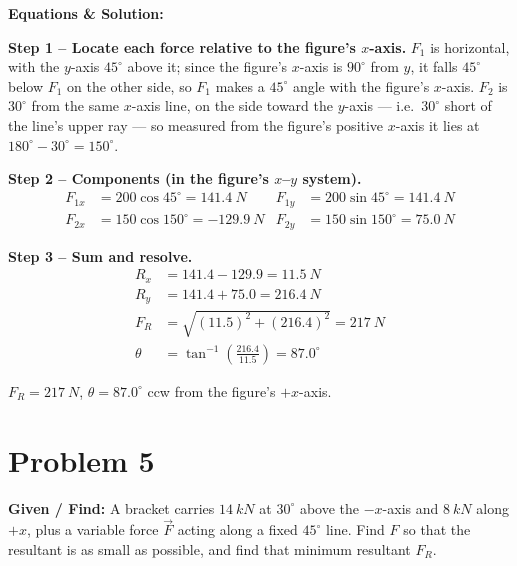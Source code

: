 \documentclass[11pt]{article}
\newcommand{\eqlabel}[1]{\textbf{#1}}
\begin{document}
\textbf{Equations \& Solution:}

\eqlabel{Step 1 -- Locate each force relative to the figure's $x$-axis.}
$F_1$ is horizontal, with the $y$-axis $45^\circ$ above it; since the figure's $x$-axis is $90^\circ$ from $y$, it falls $45^\circ$ below $F_1$ on the other side, so $F_1$ makes a $45^\circ$ angle with the figure's $x$-axis. $F_2$ is $30^\circ$ from the same $x$-axis line, on the side toward the $y$-axis --- i.e.\ $30^\circ$ short of the line's upper ray --- so measured from the figure's positive $x$-axis it lies at $180^\circ - 30^\circ = 150^\circ$.

\eqlabel{Step 2 -- Components (in the figure's $x$--$y$ system).}
\begin{align*}
    F_{1x} &= 200\cos 45^\circ = \SI{141.4}{N} & F_{1y} &= 200 \sin 45^\circ = \SI{141.4}{N} \\
    F_{2x} &= 150 \cos 150^\circ = \SI{-129.9}{N} & F_{2y} &= 150 \sin 150^\circ = \SI{75.0}{N}
\end{align*}

\eqlabel{Step 3 -- Sum and resolve.}
\begin{align*}
    R_x &= 141.4 - 129.9 = \SI{11.5}{N} \\
    R_y &= 141.4 + 75.0 = \SI{216.4}{N} \\
    F_R &= \sqrt{(11.5)^2+(216.4)^2} = \SI{217}{N} \\
    \theta &= \tan^{-1}\!\left(\frac{216.4}{11.5}\right) = 87.0^\circ
\end{align*}

\begin{finalanswer}
    $F_R = \SI{217}{N}$, \quad $\theta = 87.0^\circ$ ccw from the figure's $+x$-axis.
\end{finalanswer}

\clearpage
\section*{Problem 5}

\textbf{Given / Find:} A bracket carries $\SI{14}{kN}$ at $30^\circ$ above the $-x$-axis and $\SI{8}{kN}$ along $+x$, plus a variable force $\vec{F}$ acting along a fixed $45^\circ$ line. Find $F$ so that the resultant is as small as possible, and find that minimum resultant $F_R$.
\end{document}
